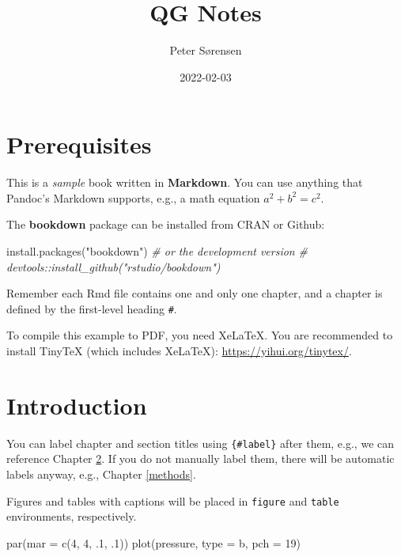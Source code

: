 \documentclass[
]{book}
\title{QG Notes}
\author{Peter Sørensen}
\date{2022-02-03}
\newenvironment{Shaded}{\begin{snugshade}}{\end{snugshade}}
\newcommand{\AttributeTok}[1]{\textcolor[rgb]{0.77,0.63,0.00}{#1}}
\newcommand{\CommentTok}[1]{\textcolor[rgb]{0.56,0.35,0.01}{\textit{#1}}}
\newcommand{\DecValTok}[1]{\textcolor[rgb]{0.00,0.00,0.81}{#1}}
\newcommand{\FunctionTok}[1]{\textcolor[rgb]{0.00,0.00,0.00}{#1}}
\newcommand{\NormalTok}[1]{#1}
\newcommand{\StringTok}[1]{\textcolor[rgb]{0.31,0.60,0.02}{#1}}
\begin{document}
\maketitle

{
\setcounter{tocdepth}{1}
\tableofcontents
}
\hypertarget{prerequisites}{%
\chapter{Prerequisites}\label{prerequisites}}

This is a \emph{sample} book written in \textbf{Markdown}. You can use anything that Pandoc's Markdown supports, e.g., a math equation \(a^2 + b^2 = c^2\).

The \textbf{bookdown} package can be installed from CRAN or Github:

\begin{Shaded}
\begin{Highlighting}[]
\FunctionTok{install.packages}\NormalTok{(}\StringTok{"bookdown"}\NormalTok{)}
\CommentTok{\# or the development version}
\CommentTok{\# devtools::install\_github("rstudio/bookdown")}
\end{Highlighting}
\end{Shaded}

Remember each Rmd file contains one and only one chapter, and a chapter is defined by the first-level heading \texttt{\#}.

To compile this example to PDF, you need XeLaTeX. You are recommended to install TinyTeX (which includes XeLaTeX): \url{https://yihui.org/tinytex/}.

\hypertarget{intro}{%
\chapter{Introduction}\label{intro}}

You can label chapter and section titles using \texttt{\{\#label\}} after them, e.g., we can reference Chapter \ref{intro}. If you do not manually label them, there will be automatic labels anyway, e.g., Chapter \ref{methods}.

Figures and tables with captions will be placed in \texttt{figure} and \texttt{table} environments, respectively.

\begin{Shaded}
\begin{Highlighting}[]
\FunctionTok{par}\NormalTok{(}\AttributeTok{mar =} \FunctionTok{c}\NormalTok{(}\DecValTok{4}\NormalTok{, }\DecValTok{4}\NormalTok{, .}\DecValTok{1}\NormalTok{, .}\DecValTok{1}\NormalTok{))}
\FunctionTok{plot}\NormalTok{(pressure, }\AttributeTok{type =} \StringTok{\textquotesingle{}b\textquotesingle{}}\NormalTok{, }\AttributeTok{pch =} \DecValTok{19}\NormalTok{)}
\end{Highlighting}
\end{Shaded}
\end{document}
